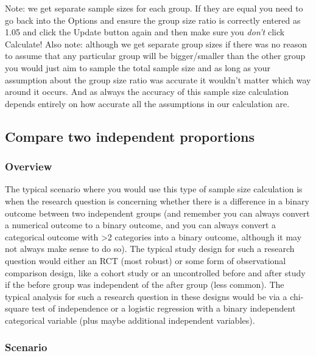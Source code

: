 \documentclass[
]{book}
\begin{document}
Note: we get separate sample sizes for each group. If they are equal you need to go back into the Options and ensure the group size ratio is correctly entered as 1.05 and click the Update button again and then make sure you \emph{don't} click Calculate! Also note: although we get separate group sizes if there was no reason to assume that any particular group will be bigger/smaller than the other group you would just aim to sample the total sample size and as long as your assumption about the group size ratio was accurate it wouldn't matter which way around it occurs. And as always the accuracy of this sample size calculation depends entirely on how accurate all the assumptions in our calculation are.

\hypertarget{compare-two-independent-proportions}{%
\subsection{Compare two independent proportions}\label{compare-two-independent-proportions}}

\hypertarget{overview-8}{%
\subsubsection{Overview}\label{overview-8}}

The typical scenario where you would use this type of sample size calculation is when the research question is concerning whether there is a difference in a binary outcome between two independent groups (and remember you can always convert a numerical outcome to a binary outcome, and you can always convert a categorical outcome with \textgreater2 categories into a binary outcome, although it may not always make sense to do so). The typical study design for such a research question would either an RCT (most robust) or some form of observational comparison design, like a cohort study or an uncontrolled before and after study if the before group was independent of the after group (less common). The typical analysis for such a research question in these designs would be via a chi-square test of independence or a logistic regression with a binary independent categorical variable (plus maybe additional independent variables).

\hypertarget{scenario-6}{%
\subsubsection{Scenario}\label{scenario-6}}
\end{document}
